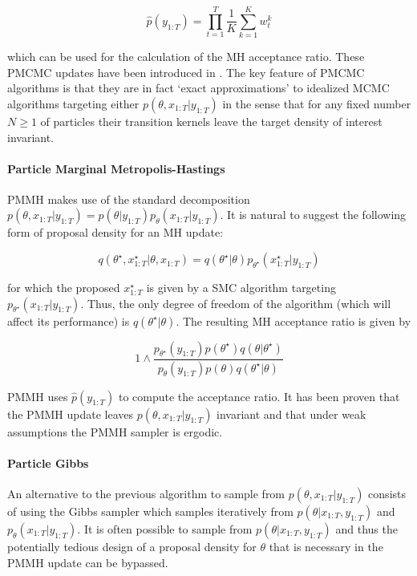 $$ \hat{p}(y_{1:T}) = \prod_{t=1}^T \frac{1}{K} \sum_{k=1}^K w_t^k $$

which can be used for the calculation of the \gls{MH} acceptance ratio. 
These \gls{PMCMC} updates have been introduced in \cite{Andrieu:2010gc}.
The key feature of PMCMC algorithms is that they are in fact ‘exact approximations’ to idealized \gls{MCMC} algorithms targeting either $p(\theta, x_{1:T}|y_{1:T})$ in the sense that for any fixed number $N\ge1$ of particles their transition kernels leave the target density of interest invariant. 


\paragraph{Particle Marginal Metropolis-Hastings}
\gls{PMMH} makes use of the standard decomposition $p(\theta, x_{1:T}|y_{1:T}) = p(\theta | y_{1:T}) p_\theta(x_{1:T}|y_{1:T})$. 
It is natural to suggest the following form of proposal density for an \gls{MH} update:

$$ q\left( \theta^\star, x_{1:T}^\star | \theta, x_{1:T} \right) = q(\theta^\star|\theta) p_{\theta^\star}(x_{1:T}^\star|y_{1:T})$$

for which the proposed $x_{1:T}^\star$ is given by a \gls{SMC} algorithm targeting $p_{\theta^\star}(x_{1:T}|y_{1:T})$. Thus, the only degree of freedom of the algorithm (which will affect its performance) is $q(\theta^\star|\theta)$. The resulting \gls{MH} acceptance ratio is given by

$$ 1 \wedge \frac{p_{\theta^\star}(y_{1:T}) p(\theta^\star) q(\theta|\theta^\star)}{p_{\theta}(y_{1:T}) p(\theta) q(\theta^\star|\theta)} $$

\gls{PMMH} uses $\hat{p}(y_{1:T})$ to compute the acceptance ratio. It has been proven \cite{Andrieu:2010gc} that the \gls{PMMH} update leaves $p(\theta, x_{1:T}|y_{1:T})$ invariant and that under weak assumptions the \gls{PMMH} sampler is ergodic.


\paragraph{Particle Gibbs}
An alternative to the previous algorithm to sample from $p(\theta, x_{1:T}|y_{1:T})$ consists of using the Gibbs sampler which samples iteratively from $p(\theta|x_{1:T},y_{1:T})$ and $p_\theta(x_{1:T}|y_{1:T})$.
It is often possible to sample from $p(\theta|x_{1:T},y_{1:T})$ and thus the potentially tedious design of a proposal density for $\theta$ that is necessary in the \gls{PMMH} update can be bypassed.

